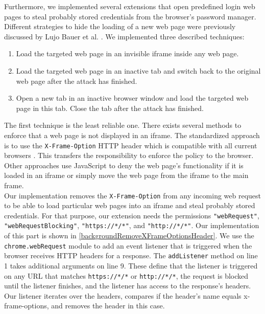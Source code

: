 	
	Furthermore, we implemented several extensions that open predefined login web pages to steal probably stored credentials from the browser's password manager. Different strategies to hide the loading of a new web page were previously discussed by Lujo Bauer et al. \cite{extensions:cns14}. We implemented three described techniques:
	
	\begin{enumerate}
		\itemsep-0.3em
		\item Load the targeted web page in an invisible iframe inside any web page.
		\item Load the targeted web page in an inactive tab and switch back to the original web page after the attack has finished.
		\item Open a new tab in an inactive browser window and load the targeted web page in this tab. Close the tab after the attack has finished.
	\end{enumerate} 
	
	The first technique is the least reliable one. There exists several methods to enforce that a web page is not displayed in an iframe. The standardized approach is to use the \texttt{X-Frame-Option} HTTP header which is compatible with all current browsers \cite{xFrameOptionsSpezification, xFrameOptionsCompability}. This transfers the responsibility to enforce the policy to the browser. Other approaches use JavaScript to deny the web page's functionality if it is loaded in an iframe or simply move the web page from the iframe to the main frame. \\
	
	Our implementation removes the \texttt{X-Frame-Option} from any incoming web request to be able to load particular web pages into an iframe and steal probably stored credentials. For that purpose, our extension needs the permissions \texttt{"webRequest"}, \texttt{"webRequestBlocking"}, \texttt{"https://*/*"}, and \texttt{"http://*/*"}. Our implementation of this part is shown in \autoref{backgroundRemoveXFrameOptionsHeader}. We use the \texttt{chrome.webRequest} module to add an event listener that is triggered when the browser receives HTTP headers for a response. The \texttt{addListener} method on line 1 takes additional arguments on line 9. These define that the listener is triggered on any URL that matches \texttt{https://*/*} or \texttt{http://*/*}, the request is blocked until the listener finishes, and the listener has access to the response's headers. Our listener iterates over the headers, compares if the header's name equals x-frame-options, and removes the header in this case. \\
	
